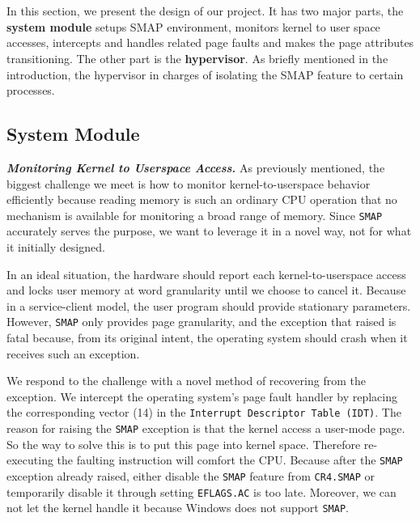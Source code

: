 
\section{\name}
\label{sec:design}

In this section, we present the design of our project. It has two major parts, the \textbf{system module} setups SMAP environment, monitors kernel to user space accesses, intercepts and handles related page faults and makes the page attributes transitioning. The other part is the \textbf{hypervisor}. As briefly mentioned in the introduction, the hypervisor in charges of isolating the SMAP feature to certain processes.


\subsection{System Module}

\textbf{\textit{Monitoring Kernel to Userspace Access.}} As previously mentioned, the biggest challenge we meet is how to monitor kernel-to-userspace behavior efficiently because reading memory is such an ordinary CPU operation that no mechanism is available for monitoring a broad range of memory. Since \texttt{SMAP} accurately serves the purpose, we want to leverage it in a novel way, not for what it initially designed.


In an ideal situation, the hardware should report each kernel-to-userspace access and locks user memory at word granularity until we choose to cancel it. Because in a service-client model, the user program should provide stationary parameters. However, \texttt{SMAP} only provides page granularity, and the exception that raised is fatal because, from its original intent, the operating system should crash when it receives such an exception.

We respond to the challenge with a novel method of recovering from the exception. We intercept the operating system's page fault handler by replacing the corresponding vector (14) in the \texttt{Interrupt Descriptor Table (IDT)}. The reason for raising the \texttt{SMAP} exception is that the kernel access a user-mode page. So the way to solve this is to put this page into kernel space. Therefore re-executing the faulting instruction will comfort the CPU. Because after the \texttt{SMAP} exception already raised, either disable the \texttt{SMAP} feature from \texttt{CR4.SMAP} or temporarily disable it through setting \texttt{EFLAGS.AC} is too late. Moreover, we can not let the kernel handle it because Windows does not support \texttt{SMAP}. 

